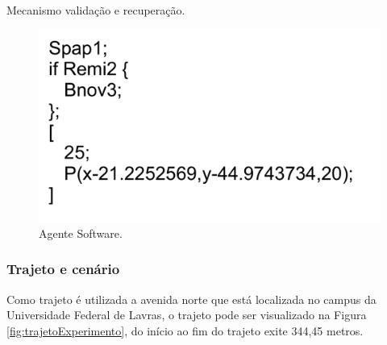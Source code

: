 \begin{algorithm}
	\scriptsize
	\Inicio{
		\Entrada{Agente}
		$instrucoes = agente.pegarInstrucoes()$\;
		$i \gets 0$\;

		\uIf{agente.contem([)}{
			\Repita{$i < instrucoes.quantidade$}{
				$instrucao \gets instrucao[i]$ \;
				\uIf{$instrucao.tamanho < 5$}{
					\uIf{verificar(instrucao.primeiroCaracter)}{
						$instrucao \gets recuperar(instrucao.primeiroCaracter)$\;
					}
					\Else{
						\uIf(verficar(instrucao.ultimoCaracter)){
							$instrucao \gets recuperar(instrucao.ultimoCaracter)$\;
						}
						\Else{
							agente.remover()\;
						}
					}
					
				}
				\Else{
					agente.remover()\;
				}
				i++\;
			}
			\uIf{$agente.ultimoCaracter \neq ]$}{
				$agente.ultimoCaracter \gets ]$
			}
		}
		\Else{
			agente.remover()\;
		}
	}

		
	\caption{Mecanismo validação e recuperação.}
	\label{lst:mecanismoValidacaoRecuperacao}
\end{algorithm}

\begin{figure}[htbp]
	\centering
	\includegraphics[scale=0.3]{metodologia/figuras/exemploCodigoAgente.pdf}
	\caption{Agente Software.}
	\label{fig:exemploCodigoAgente}
\end{figure}

\subsubsection{Trajeto e cenário}

Como trajeto é utilizada a avenida norte que está localizada no campus da Universidade Federal de Lavras, o trajeto pode ser visualizado na Figura \ref{fig:trajetoExperimento}, do início ao fim do trajeto exite 344,45 metros. 

